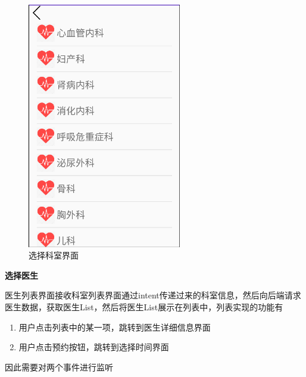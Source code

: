 \documentclass[UTF8,12pt]{article}
\begin{document}
\begin{figure}[htbp]
    \centering
    \includegraphics[width=0.6\textwidth]{imgs/21.png}
    \caption{选择科室界面}
\end{figure}

\newpage

\textbf{选择医生}

医生列表界面接收科室列表界面通过intent传递过来的科室信息，然后向后端请求医生数据，获取医生List，然后将医生List展示在列表中，列表实现的功能有

\begin{enumerate}
    \item 用户点击列表中的某一项，跳转到医生详细信息界面
    \item 用户点击预约按钮，跳转到选择时间界面
\end{enumerate}

因此需要对两个事件进行监听
\end{document}
